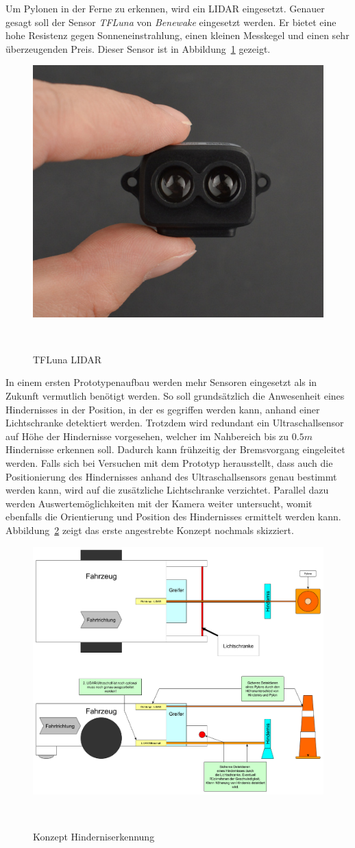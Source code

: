 \documentclass[main.tex]{subfiles} %
\begin{document}
Um Pylonen in der Ferne zu erkennen, wird ein LIDAR eingesetzt. Genauer gesagt
soll der Sensor \textit{TFLuna} von \textit{Benewake} eingesetzt werden. Er
bietet eine hohe Resistenz gegen Sonneneinstrahlung, einen kleinen Messkegel
und einen sehr überzeugenden Preis. Dieser Sensor ist in
Abbildung~\ref{fig:TFLuna} gezeigt.

\begin{figure}[h!]
    \centering
    \includegraphics[width=0.25\linewidth]{./fig_Hinderniserkennung/TFLuna_Benewake.png}
    \caption{TFLuna LIDAR}~\label{fig:TFLuna}
\end{figure}

In einem ersten Prototypenaufbau werden mehr Sensoren eingesetzt als in Zukunft
vermutlich benötigt werden. So soll grundsätzlich die Anwesenheit eines
Hindernisses in der Position, in der es gegriffen werden kann, anhand einer
Lichtschranke detektiert werden. Trotzdem wird redundant ein Ultraschallsensor
auf Höhe der Hindernisse vorgesehen, welcher im Nahbereich bis zu $0.5m$
Hindernisse erkennen soll. Dadurch kann frühzeitig der Bremsvorgang eingeleitet
werden. Falls sich bei Versuchen mit dem Prototyp herausstellt, dass auch die
Positionierung des Hindernisses anhand des Ultraschallsensors genau bestimmt
werden kann, wird auf die zusätzliche Lichtschranke verzichtet. Parallel dazu
werden Auswertemöglichkeiten mit der Kamera weiter untersucht, womit ebenfalls
die Orientierung und Position des Hindernisses ermittelt werden kann.
Abbildung~\ref{fig:Hinderniserkennung} zeigt das erste angestrebte Konzept
nochmals skizziert.

\begin{figure}[h!]
    \centering
    \includegraphics[width=0.75\linewidth]{./fig_Hinderniserkennung/Konzept_Hinderniserkennung.pdf}
    \caption{Konzept Hinderniserkennung}~\label{fig:Hinderniserkennung}
\end{figure}
\end{document}
